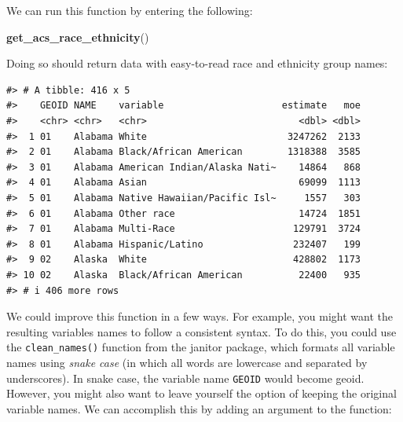 \documentclass[
]{book}
\newenvironment{Shaded}{\begin{snugshade}}{\end{snugshade}}
\newcommand{\FunctionTok}[1]{\textcolor[rgb]{0.13,0.29,0.53}{\textbf{#1}}}
\newcommand{\NormalTok}[1]{#1}
\begin{document}
We can run this function by entering the following:

\begin{Shaded}
\begin{Highlighting}[]
\FunctionTok{get\_acs\_race\_ethnicity}\NormalTok{()}
\end{Highlighting}
\end{Shaded}

Doing so should return data with easy-to-read race and ethnicity group names:

\begin{verbatim}
#> # A tibble: 416 x 5
#>    GEOID NAME    variable                     estimate   moe
#>    <chr> <chr>   <chr>                           <dbl> <dbl>
#>  1 01    Alabama White                         3247262  2133
#>  2 01    Alabama Black/African American        1318388  3585
#>  3 01    Alabama American Indian/Alaska Nati~    14864   868
#>  4 01    Alabama Asian                           69099  1113
#>  5 01    Alabama Native Hawaiian/Pacific Isl~     1557   303
#>  6 01    Alabama Other race                      14724  1851
#>  7 01    Alabama Multi-Race                     129791  3724
#>  8 01    Alabama Hispanic/Latino                232407   199
#>  9 02    Alaska  White                          428802  1173
#> 10 02    Alaska  Black/African American          22400   935
#> # i 406 more rows
\end{verbatim}

We could improve this function in a few ways. For example, you might want the resulting variables names to follow a consistent syntax. To do this, you could use the \texttt{clean\_names()} function from the janitor package, which formats all variable names using \emph{snake case} (in which all words are lowercase and separated by underscores). In snake case, the variable name \texttt{GEOID} would become geoid. However, you might also want to leave yourself the option of keeping the original variable names. We can accomplish this by adding an argument to the function:
\end{document}
